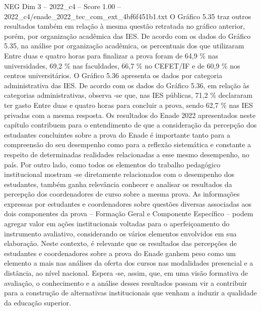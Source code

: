 \begin{textsample}{NEG Dim 3 – 2022\_c4 – Score 1.00 – 2022\_c4/enade\_2022\_tec\_com\_ext\_4bf6f451b1.txt}
O Gráfico 5.35 traz outros resultados também em relação à mesma questão retratada no gráfico anterior, porém, por organização acadêmica das IES.
De acordo com os dados do Gráfico 5.35, na análise por organização acadêmica, os percentuais dos que utilizaram Entre duas e quatro horas para finalizar a prova foram de 64,9 \% nas universidades, 69,2 \% nas faculdades, 66,7 \% no CEFET/IF e de 60,9 \% nos centros universitários.
O Gráfico 5.36 apresenta os dados por categoria administrativa das IES.
De acordo com os dados do Gráfico 5.36, em relação às categorias administrativas, observa -se que, nas IES públicas, 71,2 \% declararam ter gasto Entre duas e quatro horas para concluir a prova, sendo 62,7 \% nas IES privadas com a mesma resposta.
Os resultados do Enade 2022 apresentados neste capítulo contribuem para o entendimento de que a consideração da percepção dos estudantes concluintes sobre a prova do Enade é importante tanto para a compreensão do seu desempenho como para a reflexão sistemática e constante a respeito de determinadas realidades relacionadas a esse mesmo desempenho, no país.
Por outro lado, como todos os elementos do trabalho pedagógico institucional mostram -se diretamente relacionados com o desempenho dos estudantes, também ganha relevância conhecer e analisar os resultados da percepção dos coordenadores de curso sobre a mesma prova.
As informações expressas por estudantes e coordenadores sobre questões diversas associadas aos dois componentes da prova – Formação Geral e Componente Específico – podem agregar valor em ações institucionais voltadas para o aperfeiçoamento do instrumento avaliativo, considerando os vários elementos envolvidos em sua elaboração.
Neste contexto, é relevante que os resultados das percepções de estudantes e coordenadores sobre a prova do Enade ganhem peso como um elemento a mais nas análises da oferta dos cursos nas modalidades presencial e a distância, ao nível nacional.
Espera -se, assim, que, em uma visão formativa de avaliação, o conhecimento e a análise desses resultados possam vir a contribuir para a construção de alternativas institucionais que venham a induzir a qualidade da educação superior.

\end{textsample}
